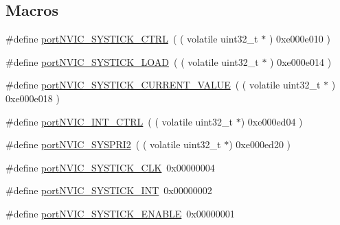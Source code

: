 \subsection*{Macros}
\begin{DoxyCompactItemize}
\item 
\#define \mbox{\hyperlink{thirdparty_2freertos_2freertos-10_80_80_2_source_2portable_2_g_c_c_2_a_r_m___c_m0_2port_8c_a6295343bded0da55b94bdc618a1ff0b3}{port\+N\+V\+I\+C\+\_\+\+S\+Y\+S\+T\+I\+C\+K\+\_\+\+C\+T\+RL}}~( ( volatile uint32\+\_\+t $\ast$ ) 0xe000e010 )
\item 
\#define \mbox{\hyperlink{thirdparty_2freertos_2freertos-10_80_80_2_source_2portable_2_g_c_c_2_a_r_m___c_m0_2port_8c_aa9dc1604e9cbc26e13638ef84c807ffb}{port\+N\+V\+I\+C\+\_\+\+S\+Y\+S\+T\+I\+C\+K\+\_\+\+L\+O\+AD}}~( ( volatile uint32\+\_\+t $\ast$ ) 0xe000e014 )
\item 
\#define \mbox{\hyperlink{thirdparty_2freertos_2freertos-10_80_80_2_source_2portable_2_g_c_c_2_a_r_m___c_m0_2port_8c_ab1be1a76af0881f8145d7e3104d69810}{port\+N\+V\+I\+C\+\_\+\+S\+Y\+S\+T\+I\+C\+K\+\_\+\+C\+U\+R\+R\+E\+N\+T\+\_\+\+V\+A\+L\+UE}}~( ( volatile uint32\+\_\+t $\ast$ ) 0xe000e018 )
\item 
\#define \mbox{\hyperlink{thirdparty_2freertos_2freertos-10_80_80_2_source_2portable_2_g_c_c_2_a_r_m___c_m0_2port_8c_a947759849fc561d70f3bad8a15f5737c}{port\+N\+V\+I\+C\+\_\+\+I\+N\+T\+\_\+\+C\+T\+RL}}~( ( volatile uint32\+\_\+t $\ast$) 0xe000ed04 )
\item 
\#define \mbox{\hyperlink{thirdparty_2freertos_2freertos-10_80_80_2_source_2portable_2_g_c_c_2_a_r_m___c_m0_2port_8c_a9689a77ef2aeb5ba5bd6042e6379c163}{port\+N\+V\+I\+C\+\_\+\+S\+Y\+S\+P\+R\+I2}}~( ( volatile uint32\+\_\+t $\ast$) 0xe000ed20 )
\item 
\#define \mbox{\hyperlink{thirdparty_2freertos_2freertos-10_80_80_2_source_2portable_2_g_c_c_2_a_r_m___c_m0_2port_8c_a590d0fe4b2df70ef49aa19708c89e6c2}{port\+N\+V\+I\+C\+\_\+\+S\+Y\+S\+T\+I\+C\+K\+\_\+\+C\+LK}}~0x00000004
\item 
\#define \mbox{\hyperlink{thirdparty_2freertos_2freertos-10_80_80_2_source_2portable_2_g_c_c_2_a_r_m___c_m0_2port_8c_af8c3f4bd42d82e070baf097363a30e3f}{port\+N\+V\+I\+C\+\_\+\+S\+Y\+S\+T\+I\+C\+K\+\_\+\+I\+NT}}~0x00000002
\item 
\#define \mbox{\hyperlink{thirdparty_2freertos_2freertos-10_80_80_2_source_2portable_2_g_c_c_2_a_r_m___c_m0_2port_8c_af78a1fa447c6312c9ea7fb8e191afc22}{port\+N\+V\+I\+C\+\_\+\+S\+Y\+S\+T\+I\+C\+K\+\_\+\+E\+N\+A\+B\+LE}}~0x00000001

\end{DoxyCompactItemize}
